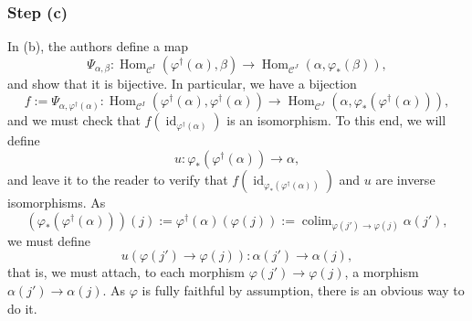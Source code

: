 \documentclass[12pt]{article}
\theoremstyle{remark}
\theoremstyle{definition}
\newcommand{\C}{\mathcal C}
\DeclareMathOperator*{\coli}{colim}
\DeclareMathOperator{\id}{id}
\DeclareMathOperator{\Hom}{Hom}%
\begin{document}
\subsubsection{Step (c)}
%
In (b), the authors define a map 
%
\begin{equation}\label{e233i} 
%
\Psi_{\alpha,\beta}:
\Hom_{\C^I}(\varphi^\dagger(\alpha),\beta)\to
\Hom_{\C^J}(\alpha,\varphi_*(\beta)),
%
\end{equation} 
%
and show that it is bijective. In particular, we have a bijection 
$$
f:=\Psi_{\alpha,\varphi^\dagger(\alpha)}:
\Hom_{\C^I}(\varphi^\dagger(\alpha),\varphi^\dagger(\alpha))\to
\Hom_{\C^J}(\alpha,\varphi_*(\varphi^\dagger(\alpha))),
$$
and we must check that $f(\id_{\varphi^\dagger(\alpha)})$ is an isomorphism. To this end, we will define 
$$
u:\varphi_*(\varphi^\dagger(\alpha))\to\alpha,
$$
and leave it to the reader to verify that $f(\id_{\varphi_*(\varphi^\dagger(\alpha))})$ and $u$ are inverse isomorphisms. As 
$$ 
(\varphi_*(\varphi^\dagger(\alpha)))(j):=\varphi^\dagger(\alpha)(\varphi(j)):=\coli_{\varphi(j')\to\varphi(j)}\alpha(j'),
$$
we must define 
$$
u(\varphi(j')\to\varphi(j)):\alpha(j')\to\alpha(j),
$$
that is, we must attach, to each morphism $\varphi(j')\to\varphi(j)$, a morphism $\alpha(j')\to\alpha(j)$. As $\varphi$ is fully faithful by assumption, there is an obvious way to do it.
%
%
\end{document}
